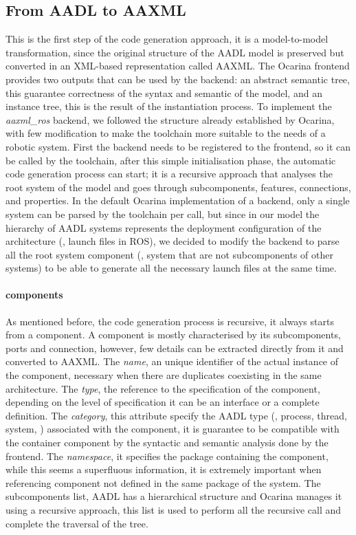 \subsection{From AADL to AAXML}
\label{sec:aadl-to-aaxml}
This is the first step of the code generation approach, it is a model-to-model transformation, since the original structure of the AADL model is preserved but converted in an XML-based representation called AAXML. The Ocarina frontend provides two outputs that can be used by the backend: an abstract semantic tree, this guarantee correctness of the syntax and semantic of the model, and an instance tree, this is the result of the instantiation process. To implement the \textit{aaxml\_ros} backend, we followed the structure already established by Ocarina, with few modification to make the toolchain more suitable to the needs of a robotic system. First the backend needs to be registered to the frontend, so it can be called by the toolchain, after this simple initialisation phase, the automatic code generation process can start; it is a recursive approach that analyses the root system of the model and goes through subcomponents, features, connections, and properties. In the default Ocarina implementation of a backend, only a single system can be parsed by the toolchain per call, but since in our model the hierarchy of AADL systems represents the deployment configuration of the architecture (\ie, launch files in ROS), we decided to modify the backend to parse all the root system component (\ie, system that are not subcomponents of other systems) to be able to generate all the necessary launch files at the same time.

\paragraph{components} As mentioned before, the code generation process is recursive, it always starts from a component. A component is mostly characterised by its subcomponents, ports and connection, however, few details can be extracted directly from it and converted to AAXML. The \textit{name}, an unique identifier of the actual instance of the component, necessary when there are duplicates coexisting in the same architecture. The \textit{type}, the reference to the specification of the component, depending on the level of specification it can be an interface or a complete definition. The \textit{category}, this attribute specify the AADL type (\eg, process, thread, system, \etc) associated with the component, it is guarantee to be compatible with the container component by the syntactic and semantic analysis done by the frontend. The \textit{namespace}, it specifies the package containing the component, while this seems a superfluous information, it is extremely important when referencing component not defined in the same package of the system. The subcomponents list, AADL has a hierarchical structure and Ocarina manages it using a recursive approach, this list is used to perform all the recursive call and complete the traversal of the tree.

